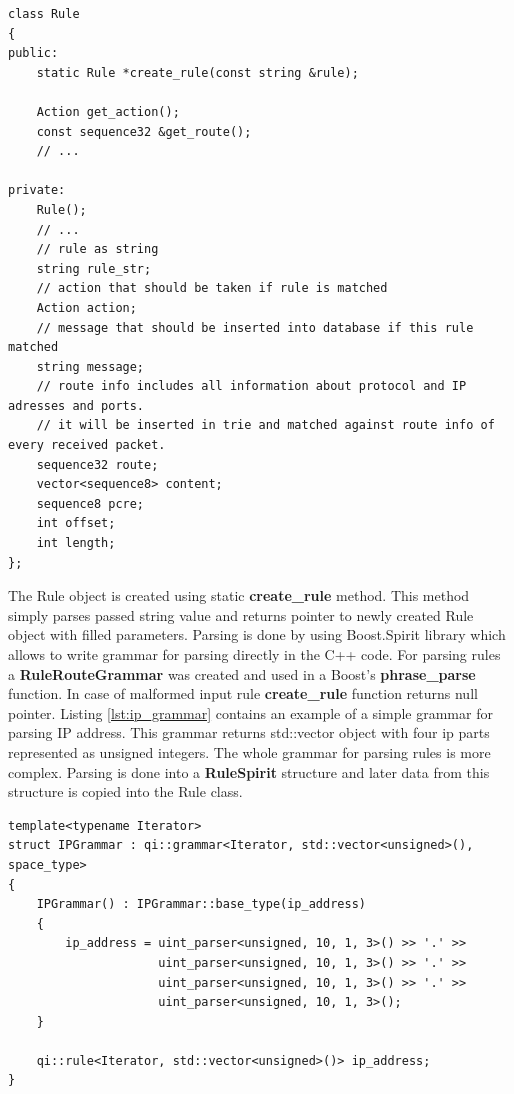 \documentclass[thesis=M,english]{FITthesis}[2011/07/15]
\begin{document}
\begin{lstlisting}
class Rule
{
public:
    static Rule *create_rule(const string &rule);

    Action get_action();
    const sequence32 &get_route();
    // ...

private:
    Rule();
    // ...
    // rule as string
    string rule_str;
    // action that should be taken if rule is matched
    Action action;
    // message that should be inserted into database if this rule matched
    string message;
    // route info includes all information about protocol and IP adresses and ports.
    // it will be inserted in trie and matched against route info of every received packet.
    sequence32 route;
    vector<sequence8> content;
    sequence8 pcre;
    int offset;
    int length;
};

\end{lstlisting}

The Rule object is created using static \textbf{create\_rule} method. This method simply parses passed string value and returns pointer to newly created Rule object with filled parameters. Parsing is done by using Boost.Spirit library which allows to write grammar for parsing directly in the C++ code. For parsing rules a \textbf{RuleRouteGrammar} was created and used in a Boost's \textbf{phrase\_parse} function. In case of malformed input rule \textbf{create\_rule} function returns null pointer. Listing \ref{lst:ip_grammar} contains an example of a simple grammar for parsing IP address. This grammar returns std::vector object with four ip parts represented as unsigned integers. The whole grammar for parsing rules is more complex. Parsing is done into a \textbf{RuleSpirit} structure and later data from this structure is copied into the Rule class.

\begin{lstlisting}
template<typename Iterator>
struct IPGrammar : qi::grammar<Iterator, std::vector<unsigned>(), space_type>
{
    IPGrammar() : IPGrammar::base_type(ip_address)
    {
        ip_address = uint_parser<unsigned, 10, 1, 3>() >> '.' >> 
                     uint_parser<unsigned, 10, 1, 3>() >> '.' >> 
                     uint_parser<unsigned, 10, 1, 3>() >> '.' >> 
                     uint_parser<unsigned, 10, 1, 3>();
    }

    qi::rule<Iterator, std::vector<unsigned>()> ip_address;
}
\end{lstlisting}
\end{document}

